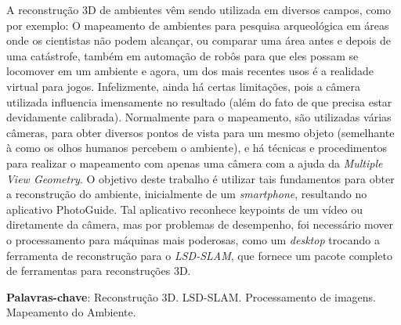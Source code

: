 \setlength{\absparsep}{18pt} %
\begin{resumo}
A reconstrução 3D de ambientes vêm sendo utilizada em diversos campos, como por exemplo: O mapeamento de ambientes para pesquisa arqueológica em áreas onde os cientistas não podem alcançar, ou comparar uma área antes e depois de uma catástrofe\cite{SLAMAP}, também em automação de robôs para que eles possam se locomover em um ambiente e agora, um dos mais recentes usos é a realidade virtual para jogos. Infelizmente, ainda há certas limitações, pois a câmera utilizada influencia imensamente no resultado (além do fato de que precisa estar devidamente calibrada). Normalmente para o mapeamento, são utilizadas várias câmeras, para obter diversos pontos de vista para um mesmo objeto (semelhante à como os olhos humanos percebem o ambiente), e há técnicas e procedimentos para realizar o mapeamento com apenas uma câmera com a ajuda da \textit{Multiple View Geometry}. O objetivo deste trabalho é utilizar tais fundamentos para obter a reconstrução do ambiente, inicialmente de um \textit{smartphone}, resultando no aplicativo PhotoGuide. Tal aplicativo reconhece keypoints de um vídeo ou diretamente da câmera, mas por problemas de desempenho, foi necessário mover o processamento para máquinas mais poderosas, como um \textit{desktop} trocando a ferramenta de reconstrução para o \textit{LSD-SLAM}, que fornece um pacote completo de ferramentas para reconstruções 3D. 

 \textbf{Palavras-chave}: Reconstrução 3D. LSD-SLAM. Processamento de imagens. Mapeamento do Ambiente.

\end{resumo}